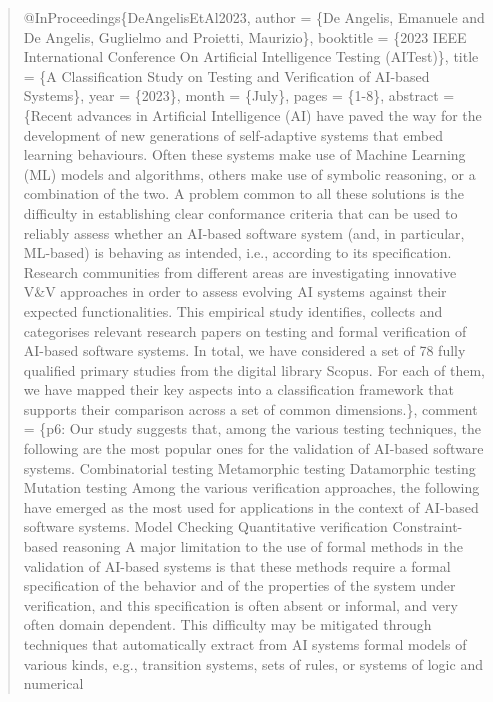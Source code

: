 \documentclass[
  letterpaper,
  DIV=11,
  numbers=noendperiod,
  oneside]{scrreprt}
\newenvironment{Shaded}{\begin{snugshade}}{\end{snugshade}}
\newcommand{\DataTypeTok}[1]{\textcolor[rgb]{0.68,0.00,0.00}{#1}}
\newcommand{\NormalTok}[1]{\textcolor[rgb]{0.00,0.23,0.31}{#1}}
\newcommand{\OtherTok}[1]{\textcolor[rgb]{0.00,0.23,0.31}{#1}}
\newcommand{\VariableTok}[1]{\textcolor[rgb]{0.07,0.07,0.07}{#1}}
\begin{document}
\begin{tcolorbox}
\begin{quote}
\begin{codelisting}[H]
\begin{Shaded}
\begin{Highlighting}[]
\VariableTok{@InProceedings}\NormalTok{\{}\OtherTok{DeAngelisEtAl2023}\NormalTok{,}
  \DataTypeTok{author}\NormalTok{           = \{De Angelis, Emanuele and De Angelis, Guglielmo and Proietti, Maurizio\},}
  \DataTypeTok{booktitle}\NormalTok{        = \{2023 IEEE International Conference On Artificial Intelligence Testing (AITest)\},}
  \DataTypeTok{title}\NormalTok{            = \{A Classification Study on Testing and Verification of AI{-}based Systems\},}
  \DataTypeTok{year}\NormalTok{             = \{2023\},}
  \DataTypeTok{month}\NormalTok{            = \{July\},}
  \DataTypeTok{pages}\NormalTok{            = \{1{-}8\},}
  \DataTypeTok{abstract}\NormalTok{         = \{Recent advances in Artificial Intelligence (AI) have paved the way for the development of new generations of self{-}adaptive systems that embed learning behaviours. Often these systems make use of Machine Learning (ML) models and algorithms, others make use of symbolic reasoning, or a combination of the two. A problem common to all these solutions is the difficulty in establishing clear conformance criteria that can be used to reliably assess whether an AI{-}based software system (and, in particular, ML{-}based) is behaving as intended, i.e., according to its specification. Research communities from different areas are investigating innovative V\&V approaches in order to assess evolving AI systems against their expected functionalities. This empirical study identifies, collects and categorises relevant research papers on testing and formal verification of AI{-}based software systems. In total, we have considered a set of 78 fully qualified primary studies from the digital library Scopus. For each of them, we have mapped their key aspects into a classification framework that supports their comparison across a set of common dimensions.\},}
  \DataTypeTok{comment}\NormalTok{          = \{p6: Our study suggests that, among the various testing techniques, the following are the most popular ones for the validation of AI{-}based software systems.}
\NormalTok{Combinatorial testing}
\NormalTok{Metamorphic testing}
\NormalTok{Datamorphic testing}
\NormalTok{Mutation testing}
\NormalTok{Among the various verification approaches, the following have emerged as the most used for applications in the context of AI{-}based software systems.}
\NormalTok{Model Checking}
\NormalTok{Quantitative verification}
\NormalTok{Constraint{-}based reasoning}
\NormalTok{A major limitation to the use of formal methods in the validation of AI{-}based systems is that these methods require a formal specification of the behavior and of the properties of the system under verification, and this specification is often absent or informal, and very often domain dependent. This difficulty may be mitigated through techniques that automatically extract from AI systems formal models of various kinds, e.g., transition systems, sets of rules, or systems of logic and numerical}

\end{Highlighting}
\end{Shaded}
\end{codelisting}
\end{quote}
\end{tcolorbox}
\end{document}
